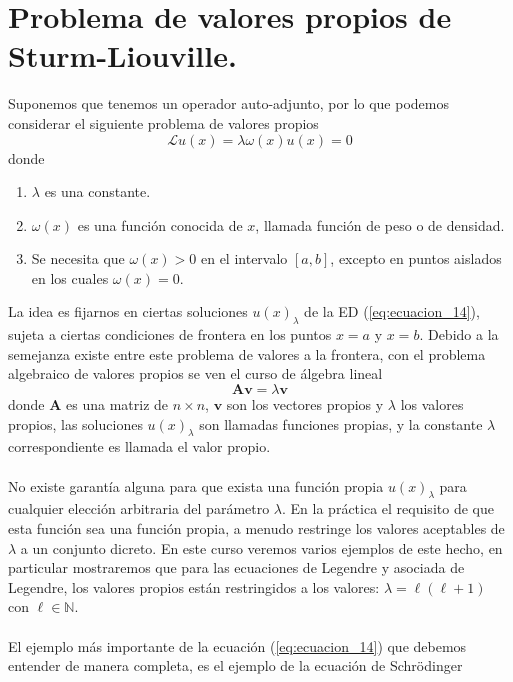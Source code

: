 \section{Problema de valores propios de Sturm-Liouville.}
Suponemos que tenemos un operador auto-adjunto, por lo que podemos considerar el siguiente problema de valores propios
\begin{equation}
\mathscr{L} u(x) =  \lambda \omega(x) u(x) = 0
\label{eq:ecuacion_14}
\end{equation}
donde
\begin{enumerate}
\item $\lambda$ es una constante.
\item $\omega(x)$ es una función conocida de $x$, llamada función de peso o de densidad.
\item Se necesita que $\omega(x)>0$ en el intervalo $[a,b]$, excepto en puntos aislados en los cuales $\omega(x)=0$.
\end{enumerate}
La idea es fijarnos en ciertas soluciones $u(x)_{\lambda}$ de la ED (\ref{eq:ecuacion_14}), sujeta a ciertas condiciones de frontera en los puntos $x = a$ y $x = b$. Debido a la semejanza existe entre este problema de valores a la frontera, con el problema algebraico de valores propios se ven el curso de álgebra lineal
\begin{equation}
\mathbf{A v} = \lambda \mathbf{v}
\label{eq:ecuacion_15}
\end{equation}
donde $\mathbf{A}$ es una matriz de $n \times n$, $\mathbf{v}$ son los vectores propios y $\lambda$ los valores propios, las soluciones $u(x)_{\lambda}$ son llamadas funciones propias, y la constante $\lambda$ correspondiente es llamada el valor propio.
\\
\\
No existe garantía alguna para que exista una función propia $u(x)_{\lambda}$ para cualquier elección arbitraria del parámetro $\lambda$. En la práctica el requisito de que esta función sea una función propia, a menudo restringe los valores aceptables de $\lambda$ a un conjunto dicreto. En este curso veremos varios ejemplos de este hecho, en particular  mostraremos que para las ecuaciones de Legendre y asociada de Legendre, los valores propios están restringidos a los valores: $\lambda = \ell (\ell + 1)$ con $\ell \in \mathbb{N}$.
\\
\\
El ejemplo más importante de la ecuación (\ref{eq:ecuacion_14}) que debemos entender de manera completa, es el ejemplo de la ecuación de Schrödinger
